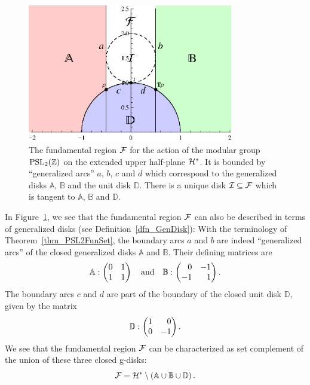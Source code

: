 \begin{remark}
\label{rem_PSL2FunDomGenDisks}
\begin{figure}
\centering
\includegraphics[width=0.8\textwidth]{figures/fundom}
\caption[The fundamental region $\FunDom$ for the action of $\PSL{\Z}$ on $\EU$]{The fundamental region $\FunDom$ for the action of the modular group $\PSL{\Z}$ on the extended upper half-plane $\EU$. It is bounded by ``generalized arcs'' $a$, $b$, $c$ and $d$ which correspond to the generalized disks $\mathbb{A}$, $\mathbb{B}$ and the unit disk $\mathbb{D}$. There is a unique disk $\mathcal{I} \subseteq \mathcal{F}$ which is tangent to $\mathbb{A}$, $\mathbb{B}$ and $\mathbb{D}$.}
\label{fig_PSL2FunDom}
\end{figure}
In Figure~\ref{fig_PSL2FunDom}, we see that the fundamental region $\FunDom$ can also be described in terms of generalized disks (see Definition~\ref{dfn_GenDisk}): With the terminology of Theorem~\ref{thm_PSL2FunSet}, the boundary arcs $a$ and $b$ are indeed ``generalized arcs'' of the closed generalized disks $\mathbb{A}$ and $\mathbb{B}$. Their defining matrices are
\begin{equation*}
\mathbb{A} : \begin{pmatrix}0 & 1 \\ 1 & 1\end{pmatrix} \quad \text{and} \quad 
\mathbb{B} : \begin{pmatrix}\phantom{+}0 & -1 \\ -1 & \phantom{+}1\end{pmatrix}.
\end{equation*}
The boundary arcs $c$ and $d$ are part of the boundary of the closed unit disk $\mathbb{D}$, given by the matrix
\begin{equation*}
\mathbb{D} : \begin{pmatrix}1 & \phantom{+}0 \\ 0 & -1\end{pmatrix}.
\end{equation*}
We see that the fundamental region $\FunDom$ can be characterized as set complement of the union of these three closed g-disks:
\begin{equation}
\label{eqn_PSL2FunDomDiskComplement}
\mathcal{F} = \mathcal{H}^\ast \setminus \left(\mathbb{A} \cup \mathbb{B} \cup \mathbb{D}\right).
\end{equation}
\end{remark}

